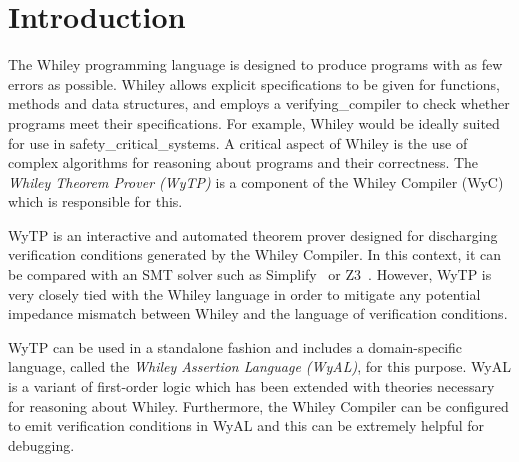 \chapter{Introduction}

The Whiley programming language is designed to produce programs with
as few errors as possible.  Whiley allows explicit specifications to
be given for functions, methods and data structures, and employs a
\gls{verifying_compiler} to check whether programs meet their
specifications.  For example, Whiley would be ideally suited for use
in \gls{safety_critical_system}s.  A critical aspect of Whiley is the
use of complex algorithms for reasoning about programs and their
correctness.  The {\em Whiley Theorem Prover (WyTP)} is a component of
the Whiley Compiler (WyC) which is responsible for this.

WyTP is an interactive and automated theorem prover designed for
discharging verification conditions generated by the Whiley Compiler.
In this context, it can be compared with an SMT solver such as
Simplify~\cite{DNS05} or Z3~\cite{MB08}.  However, WyTP is very
closely tied with the Whiley language in order to mitigate any
potential impedance mismatch between Whiley and the language of
verification conditions.

WyTP can be used in a standalone fashion and includes a
domain-specific language, called the {\em Whiley Assertion Language
  (WyAL)}, for this purpose.  WyAL is a variant of first-order logic
which has been extended with theories necessary for reasoning about
Whiley.  Furthermore, the Whiley Compiler can be configured to emit
verification conditions in WyAL and this can be extremely helpful for
debugging.
